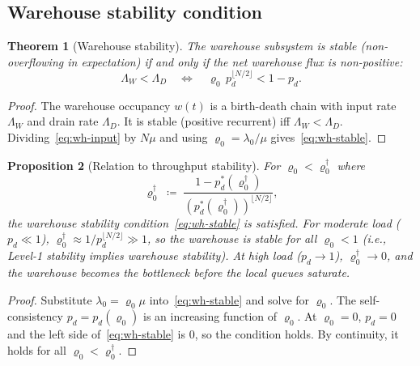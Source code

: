 \documentclass[11pt,a4paper]{report}
\newtheorem{theorem}{Theorem}[section]
\newtheorem{proposition}[theorem]{Proposition}
\newcommand{\rhozero}{\varrho_0}
\newcommand{\lambdazero}{\lambda_0}
\newcommand{\pd}{p_d}
\begin{document}
\subsection{Warehouse stability condition}

\begin{theorem}[Warehouse stability]
\label{thm:wh-stable}
The warehouse subsystem is stable (non-overflowing in expectation) if and
only if the net warehouse flux is non-positive:
\begin{equation}
  \Lambda_W < \Lambda_D
  \quad\Longleftrightarrow\quad
  \rhozero\,\pd^{\lfloor N/2\rfloor} < 1 - \pd.
  \label{eq:wh-stable}
\end{equation}
\end{theorem}

\begin{proof}
The warehouse occupancy $w(t)$ is a birth-death chain with input rate
$\Lambda_W$ and drain rate $\Lambda_D$.
It is stable (positive recurrent) iff $\Lambda_W < \Lambda_D$.
Dividing~\eqref{eq:wh-input} by $N\mu$ and using $\rhozero = \lambdazero/\mu$
gives~\eqref{eq:wh-stable}.
\end{proof}

\begin{proposition}[Relation to throughput stability]
\label{prop:l1-implies-wh}
For $\rhozero < \rhozero^{\dagger}$ where
\begin{equation}
  \rhozero^{\dagger}
  \;\coloneqq\;
  \frac{1-\pd^*(\rhozero^{\dagger})}{(\pd^*(\rhozero^{\dagger}))^{\lfloor N/2\rfloor}},
  \label{eq:rho-dagger}
\end{equation}
the warehouse stability condition~\eqref{eq:wh-stable} is satisfied.
For moderate load ($\pd \ll 1$), $\rhozero^{\dagger} \approx 1/\pd^{\lfloor N/2\rfloor} \gg 1$,
so the warehouse is stable for all $\rhozero < 1$ (i.e., Level-1 stability
implies warehouse stability).
At high load ($\pd \to 1$), $\rhozero^{\dagger} \to 0$, and the warehouse
becomes the bottleneck before the local queues saturate.
\end{proposition}

\begin{proof}
Substitute $\lambdazero = \rhozero\mu$ into~\eqref{eq:wh-stable} and
solve for $\rhozero$.  The self-consistency $\pd = \pd(\rhozero)$ is an
increasing function of $\rhozero$.  At $\rhozero = 0$, $\pd = 0$ and
the left side of~\eqref{eq:wh-stable} is 0, so the condition holds.
By continuity, it holds for all $\rhozero < \rhozero^\dagger$.
\end{proof}
\end{document}
